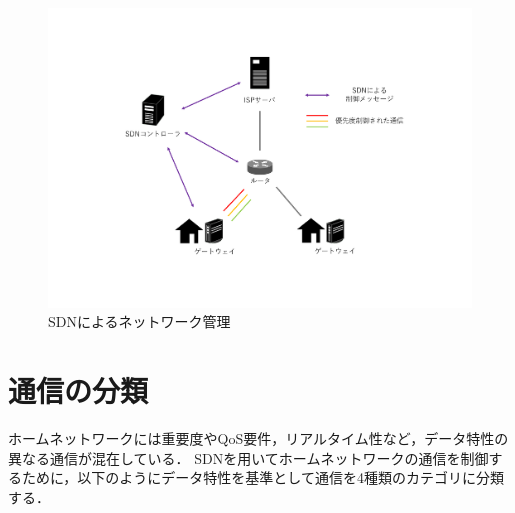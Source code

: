 \documentclass[a4paper,11pt,uplatex]{ujreport}
\begin{document}
  \begin{figure}[!tb]
    \centering
    \includegraphics[width=\linewidth]{img/proposal.pdf}
    \caption{SDNによるネットワーク管理}
    \label{fig:proposal}
  \end{figure}

\section{通信の分類}
\label{sec:通信の分類}

  ホームネットワークには重要度やQoS要件，リアルタイム性など，データ特性の異なる通信が混在している．
  SDNを用いてホームネットワークの通信を制御するために，以下のようにデータ特性を基準として通信を4種類のカテゴリに分類する．
\end{document}
